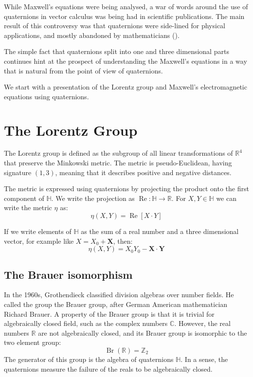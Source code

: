 \documentclass{amsart}
\newcommand{\HH}{\mathbb{H}}
\newcommand{\CC}{\mathbb{C}}
\newcommand{\RR}{\mathbb{R}}
\newcommand{\ZZ}{\mathbb{Z}}
\renewcommand{\Re}{\operatorname{Re}}
\newcommand{\Br}{\operatorname{Br}}
\begin{document}
While Maxwell's equations were being analysed, a war of words around the use of quaternions in vector calculus was being had in scientific publications.
The main result of this controversy was that quaternions were side-lined for physical applications, and mostly abandoned by mathematicians (\cite{vector}).

The simple fact that quaternions split into one and three dimensional parts continues hint at the prospect of understanding the Maxwell's equations in a way that is natural from the point of view of quaternions.

We start with a presentation of the Lorentz group and Maxwell's electromagnetic equations using quaternions.


\section{The Lorentz Group}

The Lorentz group is defined as the subgroup of all linear transformations of $\RR^4$ that preserve the Minkowski metric.
The metric is pseudo-Euclidean, having signature $(1,3)$, meaning that it describes positive and negative distances.

The metric is expressed using quaternions by projecting the product onto the first component of $\HH$. We write the projection as $\Re:\HH \to \RR$.
For $X,Y \in \HH$ we can write the metric $\eta$ as:
$$ \eta(X,Y) = \Re[X\cdot Y]$$

If we write elements of $\HH$ as the sum of a real number and a three dimensional vector, for example like $X = X_0 + \mathbf{X}$, then:
$$ \eta(X,Y) = X_0Y_0 - \mathbf{X}\cdot \mathbf{Y} $$

\subsection{The Brauer isomorphism}

In the 1960s, Grothendieck classified division algebras over number fields.
He called the group the Brauer group, after German American mathematician Richard Brauer.
A property of the Brauer group is that it is trivial for algebraically closed field, such as the complex numbers $\CC$.
However, the real numbers $\RR$ are not algebraically closed, and its Brauer group is isomorphic to the two element group:
$$\Br(\RR)=\ZZ_2$$
The generator of this group is the algebra of quaternions $\HH$.
In a sense, the quaternions measure the failure of the reals to be algebraically closed.
\end{document}
